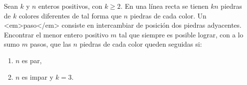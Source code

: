 Sean $k$ y $n$ enteros positivos, con $k \geq 2$. En una línea recta se tienen $kn$ piedras de $k$ colores diferentes de tal forma que $n$ piedras de cada color. Un <em>paso</em> consiste en intercambiar de posición dos piedras adyacentes. Encontrar el menor entero positivo $m$ tal que siempre es posible lograr, con a lo sumo $m$ pasos, que las $n$ piedras de cada color queden seguidas si:
 \begin{enumerate} 
   \item $n$ es par,
   \item $n$ es impar y $k=3$.
 \end{enumerate} 
